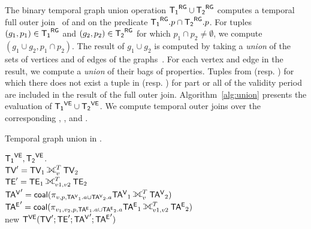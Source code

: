 The binary temporal graph union operation $\mathsf{{T_1}^{RG}} \cup \mathsf{{T_2}^{RG}}$ computes
a temporal full outer join~\cite{Gao2005} of \trga and \trgb on the
predicate $\mathsf{{T_1}^{RG}}.p \cap \mathsf{{T_2}^{RG}}.p $. For tuples $(g_1, p_1) \in \mathsf{{T_1}^{RG}}$
and $(g_2, p_2) \in \mathsf{{T_2}^{RG}}$ for which $p_1 \cap p_2 \neq \emptyset$, we
compute $(g_1 \cup g_2, p_1 \cap p_2)$.  The result of $g_1 \cup g_2$
is computed by taking a {\em union} of the sets of vertices and of
edges of the graphs~\cite{GraphTheory}.  For each vertex and edge in
the result, we compute a {\em union} of their bags of properties.
Tuples from \trga (resp. \trgb) for which there does not exist a tuple
in \trgb (resp. \trga) for part or all of the validity period are
included in the result of the full outer join. 
%
Algorithm~\ref{alg:union} presents the evaluation of $\mathsf{{T_1}^{VE}} \cup
\mathsf{{T_2}^{VE}}$.  We compute temporal outer joins over the corresponding \tv,
\te, \tav and \tae.

\begin{algorithm}[t]
\caption{Temporal graph union in \tve.}
\begin{algorithmic}[1]
\REQUIRE $\mathsf{{T_1}^{VE}}, \mathsf{{T_2}^{VE}}$.\\
\STATE $\tv' = \tv_1 \fullouterjoin^T_v \tv_2$\\
\STATE $\te' = \te_1 \fullouterjoin^T_{v1,v2} \te_2$\\
\STATE $\tav' = \cl (\pi_{v,p,\tav_1.a \cup \tav_2.a}\tav_1 \fullouterjoin^T_v \tav_2)$\\
\STATE $\tae' = \cl (\pi_{v_1,v_2,p,\tae_1.a \cup \tae_2.a}\tae_1 \fullouterjoin^T_{v1,v2} \tae_2)$\\
\RETURN new $\mathsf{T^{VE}} (\textsf{TV}';\textsf{TE}';\mathsf{TA^{V}}';\mathsf{TA^{E}}')$\\
\end{algorithmic}
\label{alg:union}
\end{algorithm}

